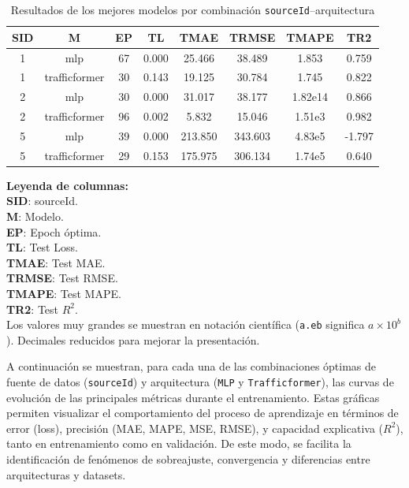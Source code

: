 \begin{table}[H]
	\centering
	\small
	\caption{Resultados de los mejores modelos por combinación \texttt{sourceId}--arquitectura}
	\label{tab:mejores_modelos}
	\begin{tabularx}{\textwidth}{c | c | c | c | c | c | c | c }
		\toprule
		\textbf{SID} & \textbf{M} & \textbf{EP} & \textbf{TL} & \textbf{TMAE} & \textbf{TRMSE} & \textbf{TMAPE} & \textbf{TR2} \\
		\midrule
		1 & mlp           & 67 & 0.000 & 25.466 & 38.489   & 1.853   & 0.759 \\
		1 & trafficformer & 30 & 0.143 & 19.125 & 30.784   & 1.745   & 0.822 \\
		2 & mlp           & 30 & 0.000 & 31.017 & 38.177   & 1.82e14 & 0.866 \\
		2 & trafficformer & 96 & 0.002 & 5.832  & 15.046   & 1.51e3  & 0.982 \\
		5 & mlp           & 39 & 0.000 & 213.850 & 343.603 & 4.83e5  & -1.797 \\
		5 & trafficformer & 29 & 0.153 & 175.975 & 306.134 & 1.74e5  & 0.640 \\
		\bottomrule
	\end{tabularx}
	\vspace{0.5em}
	\begin{minipage}{0.98\textwidth}
	\footnotesize
	\textbf{Leyenda de columnas:} \\
	\textbf{SID}: sourceId. \\
	\textbf{M}: Modelo. \\
	\textbf{EP}: Epoch óptima. \\
	\textbf{TL}: Test Loss. \\
	\textbf{TMAE}: Test MAE. \\
	\textbf{TRMSE}: Test RMSE. \\
	\textbf{TMAPE}: Test MAPE. \\
	\textbf{TR2}: Test $R^2$. \\
	Los valores muy grandes se muestran en notación científica (\texttt{a.eb} significa $a \times 10^{b}$). Decimales reducidos para mejorar la presentación.
	\end{minipage}
\end{table}


A continuación se muestran, para cada una de las combinaciones óptimas de fuente de datos (\texttt{sourceId}) y arquitectura (\texttt{MLP} y \texttt{Trafficformer}), las curvas de evolución de las principales métricas durante el entrenamiento. Estas gráficas permiten visualizar el comportamiento del proceso de aprendizaje en términos de error (loss), precisión (MAE, MAPE, MSE, RMSE), y capacidad explicativa ($R^2$), tanto en entrenamiento como en validación. De este modo, se facilita la identificación de fenómenos de sobreajuste, convergencia y diferencias entre arquitecturas y datasets.

